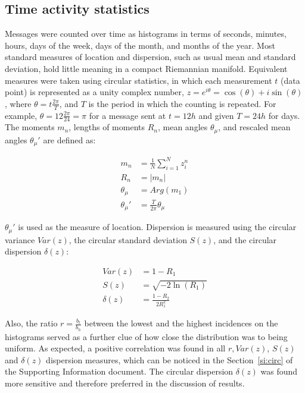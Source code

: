 \documentclass[%
	aip,
	jmp,%
	amsmath,amssymb,
	reprint,%
]{revtex4-1}
\begin{document}
\subsection{Time activity statistics}\label{sec:mtime}
Messages were counted over time as histograms in terms of seconds,
minutes, hours, days of the week, days of the month, and months of the year.
Most standard measures of location and dispersion, such as usual mean and
standard deviation, hold little meaning in a compact Riemannian manifold.
Equivalent measures were taken using circular statistics,
in which each measurement $t$ (data point) is represented as a unity complex number,
$z=e^{i\theta}=\cos(\theta)+i\sin(\theta)$, where $\theta=t\frac{2\pi}{T}$,
and $T$ is the period in which the counting is repeated.
For example, $\theta=12\frac{2\pi}{24}=\pi$ for a message sent at $t=12h$ and given $T=24h$ for days.
The moments $m_n$, lengths of moments $R_n$, mean angles $\theta_\mu$, and rescaled mean angles $\theta_\mu'$ are defined as:

\begin{align}\label{eq:cmom}
	m_n&=\frac{1}{N}\sum_{i=1}^N z_i^n \nonumber\\
	R_n&=|m_n|\\
	\theta_\mu&=Arg(m_1) \nonumber \\
	\theta_\mu'&=\frac{T}{2\pi} \theta_\mu \nonumber
\end{align}

$\theta_\mu'$ is used as the measure of location.
Dispersion is measured using the circular variance $Var(z)$,
the circular standard deviation $S(z)$, and the circular dispersion $\delta(z)$:

\begin{align}\label{eq:cmd}
	Var(z)&=1 - R_1 \nonumber\\
	S(z)&= \sqrt{-2\ln(R_1)}\\
	\delta(z)&=\frac{1-R_2}{2 R_1^2} \nonumber
\end{align}

\noindent
Also, the ratio $r=\frac{b_l}{b_h}$ between the lowest and the highest incidences on the histograms 
served as a further clue of how close the distribution was to being uniform.
As expected, a positive correlation was found in all $r, Var(z)$, $S(z)$ and $\delta(z)$ dispersion measures,
which can be noticed in the Section~\ref{si:circ} of the Supporting Information document.
The circular dispersion $\delta(z)$ was found more sensitive and therefore preferred in the discussion of results.
\end{document}

